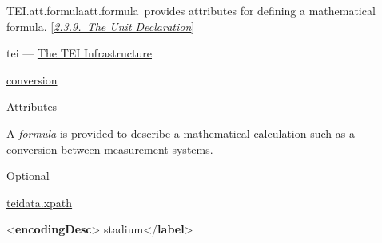 \begin{reflist}
\item[]\begin{specHead}{TEI.att.formula}{att.formula} provides attributes for defining a mathematical formula. [\textit{\hyperref[HDUDECL]{2.3.9.\ The Unit Declaration}}]\end{specHead} 
    \item[{Module}]
  tei — \hyperref[ST]{The TEI Infrastructure}
    \item[{Members}]
  \hyperref[TEI.conversion]{conversion}
    \item[{Attributes}]
  Attributes\hfil\\[-10pt]\begin{sansreflist}
    \item[@formula]
  A {\itshape formula} is provided to describe a mathematical calculation such as a conversion between measurement systems.
\begin{reflist}
    \item[{Status}]
  Optional
    \item[{Datatype}]
  \hyperref[TEI.teidata.xpath]{teidata.xpath}
\end{reflist}  
\end{sansreflist}  
    \item[{Example}]
  \leavevmode\bgroup{}\exampleFont \begin{shaded}\noindent\mbox{}{<\textbf{encodingDesc}>}\mbox{}\newline 
{}\mbox{}\newline 
\hspace*{1em}\mbox{}\newline 
\hspace*{1em}\hspace*{1em}stadium{</\textbf{label}>}\mbox{}\newline 

\end{shaded}
\end{reflist}
